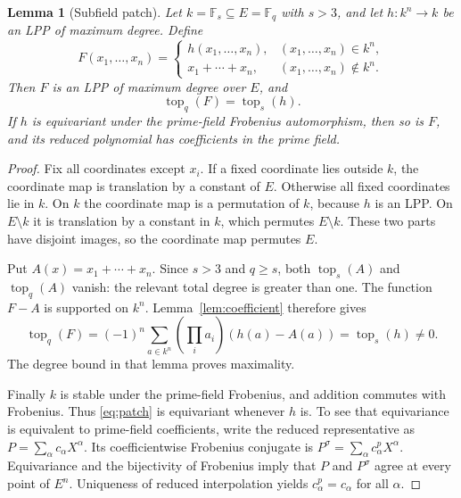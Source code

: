\documentclass[11pt]{article}
\newtheorem{lemma}[theorem]{Lemma}
\theoremstyle{remark}\newtheorem{remark}[theorem]{Remark}
\newcommand{\F}{\mathbb F}
\newcommand{\topc}{\operatorname{top}}
\begin{document}
\begin{lemma}[Subfield patch]\label{lem:patch}
Let $k=\F_s\subseteq E=\F_q$ with $s>3$, and let $h:k^n\to k$ be an LPP of
maximum degree. Define
\begin{equation}\label{eq:patch}
 F(x_1,\ldots,x_n)=\begin{cases}
 h(x_1,\ldots,x_n),&(x_1,\ldots,x_n)\in k^n,\\
 x_1+\cdots+x_n,&(x_1,\ldots,x_n)\notin k^n.
 \end{cases}
\end{equation}
Then $F$ is an LPP of maximum degree over $E$, and
\begin{equation}\label{eq:patchcoefficient}
 \topc_q(F)=\topc_s(h).
\end{equation}
If $h$ is equivariant under the prime-field Frobenius automorphism, then so is
$F$, and its reduced polynomial has coefficients in the prime field.
\end{lemma}

\begin{proof}
Fix all coordinates except $x_i$. If a fixed coordinate lies outside $k$, the
coordinate map is translation by a constant of $E$. Otherwise all fixed
coordinates lie in $k$. On $k$ the coordinate map is a permutation of $k$,
because $h$ is an LPP. On $E\setminus k$ it is translation by a constant in
$k$, which permutes $E\setminus k$. These two parts have disjoint images, so
the coordinate map permutes $E$.

Put $A(x)=x_1+\cdots+x_n$. Since $s>3$ and $q\geq s$, both $\topc_s(A)$ and
$\topc_q(A)$ vanish: the relevant total degree is greater than one. The
function $F-A$ is supported on $k^n$. Lemma~\ref{lem:coefficient} therefore
gives
\[
 \topc_q(F)=(-1)^n\sum_{a\in k^n}\left(\prod_i a_i\right)(h(a)-A(a))
 =\topc_s(h)\ne0.
\]
The degree bound in that lemma proves maximality.

Finally $k$ is stable under the prime-field Frobenius, and addition commutes
with Frobenius. Thus \eqref{eq:patch} is equivariant whenever $h$ is. To see
that equivariance is equivalent to prime-field coefficients, write the reduced
representative as $P=\sum_\alpha c_\alpha X^\alpha$. Its coefficientwise
Frobenius conjugate is $P^\sigma=\sum_\alpha c_\alpha^pX^\alpha$.
Equivariance and the bijectivity of Frobenius imply that $P$ and $P^\sigma$
agree at every point of $E^n$. Uniqueness of reduced interpolation yields
$c_\alpha^p=c_\alpha$ for all $\alpha$.
\end{proof}
\end{document}
